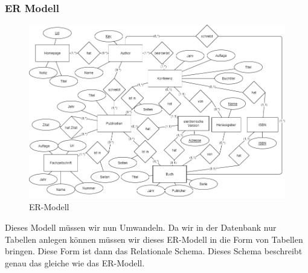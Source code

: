 \documentclass[a4paper,12pt]{article}
\begin{document}
	\subsubsection{ER Modell}
	\begin{figure}%
		\centering
		\includegraphics[width=14cm,keepaspectratio]{ER-Modell}
		\caption{ER-Modell}
		\label{fig:er-modell}
	\end{figure}

	Dieses Modell müssen wir nun Umwandeln. Da wir in der Datenbank nur Tabellen anlegen können müssen wir dieses ER-Modell in die Form von Tabellen bringen. Diese Form ist dann das Relationale Schema. Dieses Schema beschreibt genau das gleiche wie das ER-Modell.
\end{document}
